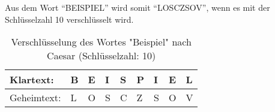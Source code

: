 \begin{table}[h!]
\centering
\caption{Die Chiffrierung nach Caesar aus dem Anwendungsbeispiel}
\label{tab:chiffrierung-caesar-anwendungsbeispiel}
\end{table}

Aus dem Wort \enquote{BEISPIEL} wird somit \enquote{LOSCZSOV}, wenn es mit der Schlüsselzahl 10 verschlüsselt wird.

\begin{table}[]
\centering
\caption{Verschlüsselung des Wortes "Beispiel" nach Caesar (Schlüsselzahl: 10)}
\label{tab:verschluesselung-caesar-beispiel-10}
\begin{tabular}{|l|llllllll|}
\hline
Klartext:   & B & E & I & S & P & I & E & L \\ \hline
Geheimtext: & L & O & S & C & Z & S & O & V \\ \hline
\end{tabular}%
\end{table}

